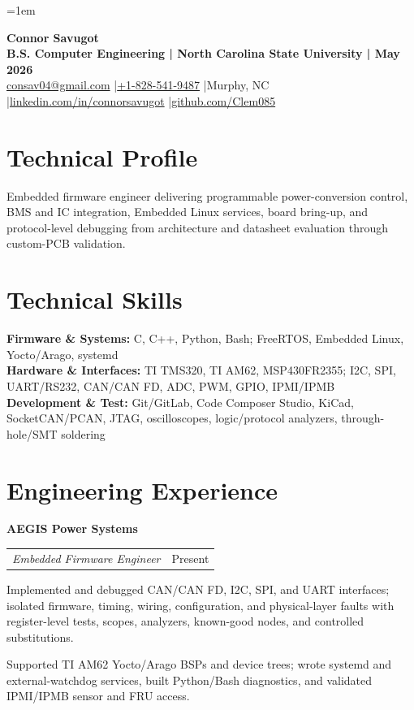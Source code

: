 \documentclass[10pt,letterpaper]{article}
\makeatletter
\newcommand{\companyheader}[1]{%
  {\fontsize{10.7}{11.2}\selectfont\bfseries #1}\par\vspace{-0.02cm}
}
\newcommand{\roleentry}[2]{%
  \begin{tabularx}{\textwidth}{@{}X>{\raggedleft\arraybackslash}p{2.50in}@{}}
    \textit{#1} & #2
  \end{tabularx}\vspace{-0.06cm}
}
\makeatother
\begin{document}
\fontsize{10}{11.15}\selectfont
\setlength{\RaggedRightRightskip}{0pt plus 5em}
\RaggedRight
\emergencystretch=1em

\begin{center}
  {\fontsize{21.5}{22.5}\selectfont\bfseries Connor Savugot}\\[2pt]
  {\bfseries B.S. Computer Engineering | North Carolina State University | May 2026}\\[2pt]
  {\fontsize{9.7}{10.5}\selectfont
    \href{mailto:consav04@gmail.com}{consav04@gmail.com}
    \enspace|\enspace \href{tel:+18285419487}{+1-828-541-9487}
    \enspace|\enspace Murphy, NC
    \enspace|\enspace \href{https://linkedin.com/in/connorsavugot}{linkedin.com/in/connorsavugot}
    \enspace|\enspace \href{https://github.com/Clem085}{github.com/Clem085}}
\end{center}
\vspace{-0.16cm}

\section{Technical Profile}
Embedded firmware engineer delivering programmable power-conversion control, BMS and IC integration, Embedded Linux services, board bring-up, and protocol-level debugging from architecture and datasheet evaluation through custom-PCB validation.

\section{Technical Skills}
\textbf{Firmware \& Systems:} C, C++, Python, Bash; FreeRTOS, Embedded Linux, Yocto/Arago, systemd\\
\textbf{Hardware \& Interfaces:} TI TMS320, TI AM62, MSP430FR2355; I2C, SPI, UART/RS232, CAN/CAN FD, ADC, PWM, GPIO, IPMI/IPMB\\
\textbf{Development \& Test:} Git/GitLab, Code Composer Studio, KiCad, SocketCAN/PCAN, JTAG, oscilloscopes, logic/protocol analyzers, through-hole/SMT soldering

\section{Engineering Experience}
\companyheader{AEGIS Power Systems}
\roleentry{Embedded Firmware Engineer}{Present}
\begin{resumebullets}
  \item Implemented and debugged CAN/CAN FD, I2C, SPI, and UART interfaces; isolated firmware, timing, wiring, configuration, and physical-layer faults with register-level tests, scopes, analyzers, known-good nodes, and controlled substitutions.
  \item Supported TI AM62 Yocto/Arago BSPs and device trees; wrote systemd and external-watchdog services, built Python/Bash diagnostics, and validated IPMI/IPMB sensor and FRU access.
\end{resumebullets}
\end{document}
